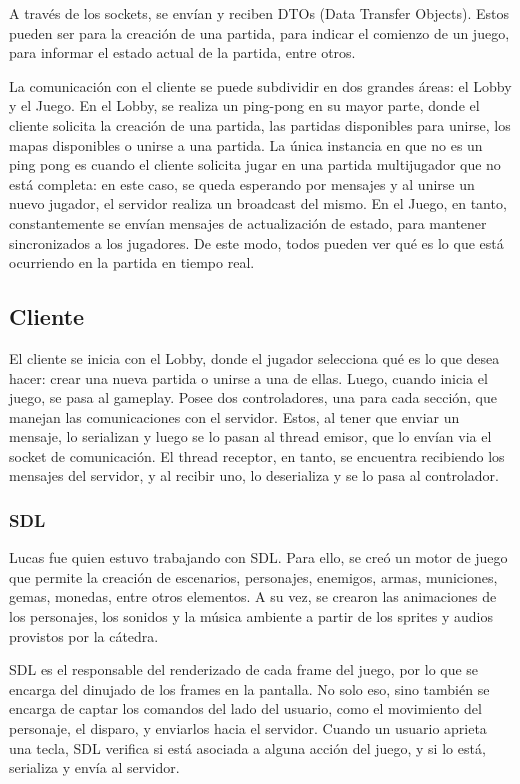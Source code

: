 \documentclass[titlepage,a4paper]{article}
\begin{document}
A través de los sockets, se envían y reciben DTOs (Data Transfer Objects). Estos pueden ser para la creación de una partida, para indicar el comienzo de un juego, para informar el estado actual de la partida, entre otros. 

La comunicación con el cliente se puede subdividir en dos grandes áreas: el Lobby y el Juego. En el Lobby, se realiza un ping-pong en su mayor parte, donde el cliente solicita la creación de una partida, las partidas disponibles para unirse, los mapas disponibles o unirse a una partida. La única instancia en que no es un ping pong es cuando el cliente solicita jugar en una partida multijugador que no está completa: en este caso, se queda esperando por mensajes y al unirse un nuevo jugador, el servidor realiza un broadcast del mismo. En el Juego, en tanto, constantemente se envían mensajes de actualización de estado, para mantener sincronizados a los jugadores. De este modo, todos pueden ver qué es lo que está ocurriendo en la partida en tiempo real.

\subsection{Cliente}
El cliente se inicia con el Lobby, donde el jugador selecciona qué es lo que desea hacer: crear una nueva partida o unirse a una de ellas. Luego, cuando inicia el juego, se pasa al gameplay. Posee dos controladores, una para cada sección, que manejan las comunicaciones con el servidor. Estos, al tener que enviar un mensaje, lo serializan y luego se lo pasan al thread emisor, que lo envían via el socket de comunicación. El thread receptor, en tanto, se encuentra recibiendo los mensajes del servidor, y al recibir uno, lo deserializa y se lo pasa al controlador.

\subsubsection{SDL}
Lucas fue quien estuvo trabajando con SDL. Para ello, se creó un motor de juego que permite la creación de escenarios, personajes, enemigos, armas, municiones, gemas, monedas, entre otros elementos. A su vez, se crearon las animaciones de los personajes, los sonidos y la música ambiente a partir de los sprites y audios provistos por la cátedra. 

SDL es el responsable del renderizado de cada frame del juego, por lo que se encarga del dinujado de los frames en la pantalla. No solo eso, sino también se encarga de captar los comandos del lado del usuario, como el movimiento del personaje, el disparo, y enviarlos hacia el servidor. Cuando un usuario aprieta una tecla, SDL verifica si está asociada a alguna acción del juego, y si lo está, serializa y envía al servidor.
\end{document}
